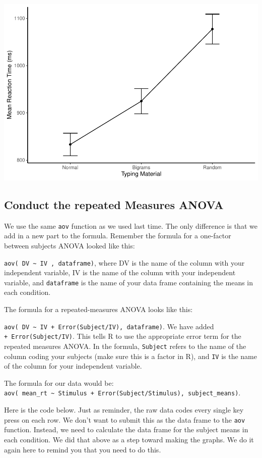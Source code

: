 \documentclass[]{book}
\begin{document}
\includegraphics{Statistics_Lab_files/figure-latex/unnamed-chunk-257-1.pdf}

\subsection{Conduct the repeated Measures
ANOVA}\label{conduct-the-repeated-measures-anova}

We use the same \texttt{aov} function as we used last time. The only
difference is that we add in a new part to the formula. Remember the
formula for a one-factor between subjects ANOVA looked like this:

\texttt{aov(\ DV\ \textasciitilde{}\ IV\ ,\ dataframe)}, where DV is the
name of the column with your independent variable, IV is the name of the
column with your independent variable, and \texttt{dataframe} is the
name of your data frame containing the means in each condition.

The formula for a repeated-measures ANOVA looks like this:

\texttt{aov(\ DV\ \textasciitilde{}\ IV\ +\ Error(Subject/IV),\ dataframe)}.
We have added \texttt{+\ Error(Subject/IV)}. This tells R to use the
appropriate error term for the repeated measures ANOVA. In the formula,
\texttt{Subject} refers to the name of the column coding your subjects
(make sure this is a factor in R), and \texttt{IV} is the name of the
column for your independent variable.

The formula for our data would be:
\texttt{aov(\ mean\_rt\ \textasciitilde{}\ Stimulus\ +\ Error(Subject/Stimulus),\ subject\_means)}.

Here is the code below. Just as reminder, the raw data codes every
single key press on each row. We don't want to submit this as the data
frame to the \texttt{aov} function. Instead, we need to calculate the
data frame for the subject means in each condition. We did that above as
a step toward making the graphs. We do it again here to remind you that
you need to do this.
\end{document}
